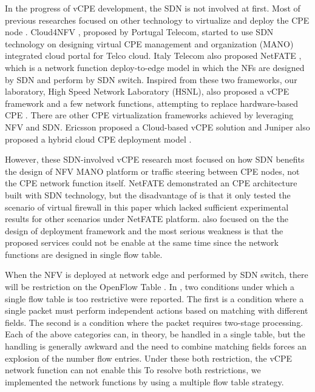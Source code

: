 In the progress of vCPE development, the SDN is not involved at first. Most of previous researches focused on other technology to virtualize and deploy the CPE node \cite{virtual-rg, security-vgw, design-vrgw, nfv-hgw-surrogate, linux-cpe, nfv-resoure-contrain-cpe}.
Cloud4NFV \cite{cloud4nfv, cloud4nfv-telco}, proposed by Portugal Telecom, started to use SDN technology on designing virtual CPE management and organization (MANO) integrated cloud portal for Telco cloud.
Italy Telecom also proposed NetFATE \cite{netfate}, which is a network function deploy-to-edge model in which the NFs are designed by SDN and perform by SDN switch.
Inspired from these two frameworks, our laboratory, High Speed Network Laboratory (HSNL), also proposed a vCPE framework and a few network functions, attempting to replace hardware-based CPE \cite{che-wei-master, che-wei-umedia}.
There are other CPE virtualization frameworks achieved by leveraging NFV and SDN.
Ericsson proposed a Cloud-based vCPE solution \cite{ericsson-vcpe} and Juniper also proposed a hybrid cloud CPE deployment model \cite{juniper-cpe}.

However, these SDN-involved vCPE research most focused on how SDN benefits the design of NFV MANO \cite{etsi-nfv-mano, etsi-nfv-mano-sdn} platform or traffic steering between CPE nodes, not the CPE network function itself. NetFATE demonstrated an CPE architecture built with SDN technology, but the disadvantage of \cite{netfate} is that it only tested the scenario of virtual firewall in this paper which lacked sufficient experimental results for other scenarios under NetFATE platform.
\cite{che-wei-master} also focused on the the design of deployment framework and the most serious weakness is that the proposed services could not be enable at the same time since the network functions are designed in single flow table.

When the NFV is deployed at network edge and performed by SDN switch, there will be restriction on the OpenFlow Table \cite{multiple-flow-table}.
In \cite{multiple-flow-table}, two conditions under which a single flow table is too restrictive were reported.
The first is a condition where a single packet must perform independent actions based on matching with different fields.
The second is a condition where the packet requires two-stage processing.
Each of the above categories can, in theory, be handled in a single table, but the handling is generally awkward and the need to combine matching fields forces an explosion of the number flow entries. Under these both restriction, the vCPE network function can not enable this
To resolve both restrictions, we implemented the network functions by using a multiple flow table strategy.

